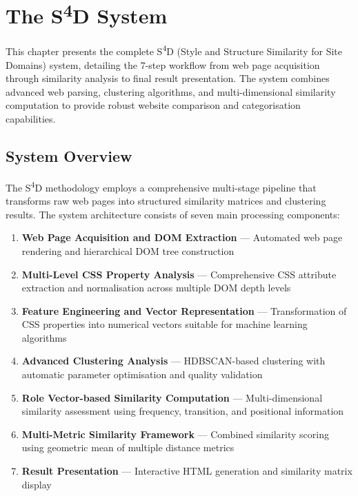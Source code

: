 \chapter{The S\textsuperscript{4}D System}
\label{ch:s4d-system}

This chapter presents the complete S\textsuperscript{4}D (Style and Structure Similarity for Site Domains) system, detailing the 7-step workflow from web page acquisition through similarity analysis to final result presentation. The system combines advanced web parsing, clustering algorithms, and multi-dimensional similarity computation to provide robust website comparison and categorisation capabilities.

\section{System Overview}
\label{sec:system-overview}

The S\textsuperscript{4}D methodology employs a comprehensive multi-stage pipeline that transforms raw web pages into structured similarity matrices and clustering results. The system architecture consists of seven main processing components:

\begin{enumerate}
    \item \textbf{Web Page Acquisition and DOM Extraction} --- Automated web page rendering and hierarchical DOM tree construction
    \item \textbf{Multi-Level CSS Property Analysis} --- Comprehensive CSS attribute extraction and normalisation across multiple DOM depth levels
    \item \textbf{Feature Engineering and Vector Representation} --- Transformation of CSS properties into numerical vectors suitable for machine learning algorithms
    \item \textbf{Advanced Clustering Analysis} --- HDBSCAN-based clustering with automatic parameter optimisation and quality validation
    \item \textbf{Role Vector-based Similarity Computation} --- Multi-dimensional similarity assessment using frequency, transition, and positional information
    \item \textbf{Multi-Metric Similarity Framework} --- Combined similarity scoring using geometric mean of multiple distance metrics
    \item \textbf{Result Presentation} --- Interactive HTML generation and similarity matrix display
\end{enumerate}


